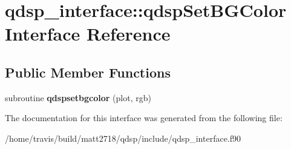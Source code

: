 \hypertarget{interfaceqdsp__interface_1_1qdspSetBGColor}{\section{qdsp\-\_\-interface\-:\-:qdsp\-Set\-B\-G\-Color Interface Reference}
\label{interfaceqdsp__interface_1_1qdspSetBGColor}
}
\subsection*{Public Member Functions}
\begin{DoxyCompactItemize}
\item 
\hypertarget{interfaceqdsp__interface_1_1qdspSetBGColor_a1039b6a5deeff7ef14b2edab1c9dfcdc}{subroutine {\bfseries qdspsetbgcolor} (plot, rgb)}\label{interfaceqdsp__interface_1_1qdspSetBGColor_a1039b6a5deeff7ef14b2edab1c9dfcdc}

\end{DoxyCompactItemize}


The documentation for this interface was generated from the following file\-:\begin{DoxyCompactItemize}
\item 
/home/travis/build/matt2718/qdsp/include/qdsp\-\_\-interface.\-f90\end{DoxyCompactItemize}
